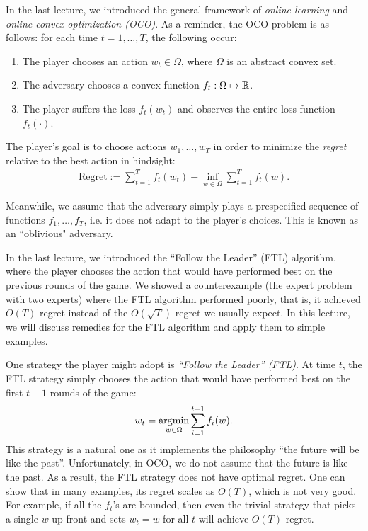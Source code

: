 \setcounter{section}{0}



In the last lecture, we introduced the general framework of \textit{online learning} and \textit{online convex optimization (OCO)}.  As a reminder, the OCO problem is as follows: for each time $t =   1, \dots, T$, the following occur:
\begin{enumerate}
\item The player chooses an action $w_t \in \Omega$, where $\Omega$ is an abstract convex set.
\item The adversary chooses a convex function $f_t : \Omega \mapsto \mathbb R$.
\item The player suffers the loss $f_t(w_t)$ and observes the entire loss function $f_t(\cdot)$.
\end{enumerate}

The player's goal is to choose actions $w_1, \dots, w_T$ in order to minimize the \textit{regret} relative to the best action in hindsight:
\begin{align}
\text{Regret} := \sum_{t = 1}^T f_t(w_t) - \inf_{w \in \Omega} \sum_{t = 1}^T f_t(w).
\end{align}

Meanwhile, we assume that the adversary simply plays a prespecified sequence of functions $f_1, \dots, f_T$, i.e. it does not adapt to the player's choices.  This is known as an ``oblivious" adversary.

In the last lecture, we introduced the ``Follow the Leader'' (FTL) algorithm, where the player chooses the action that would have performed best on the previous rounds of the game. We showed a counterexample (the expert problem with two experts) where the FTL algorithm performed poorly, that is, it achieved $O(T)$ regret instead of the $O(\sqrt{T})$ regret we usually expect. In this lecture, we will discuss remedies for the FTL algorithm and apply them to simple examples.


One strategy the player might adopt is \textit{``Follow the Leader'' (FTL)}.  At time $t$, the FTL strategy simply chooses the action that would have performed best on the first $t - 1$ rounds of the game:
\begin{align}
w_t = \operatorname*{\textup{argmin}}_{w \in \Omega} \sum_{i = 1}^{t - 1} f_i(w). \label{lec16:eqn:ftl}
\end{align}
This strategy is a natural one as it implements the philosophy ``the future will be like the past''. Unfortunately, in OCO, we do not assume that the future is like the past.  As a result, the FTL strategy does not have optimal regret. One can show that in many examples, its regret scales as $O(T)$, which is not very good.  For example, if all the $f_t$'s are bounded, then even the trivial strategy that picks a single $w$ up front and sets $w_t = w$ for all $t$ will achieve $O(T)$ regret.

